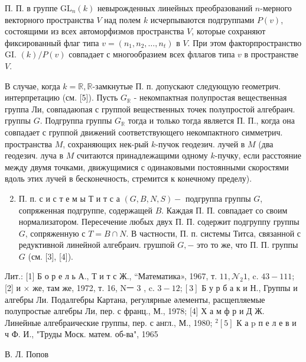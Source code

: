 \documentclass[10pt]{article}
\begin{document}
П. П. в группе $\mathrm{GL}_{n}(k)$ невырожденных линейных преобразований $n$-мерного векторного пространства $V$ над полем $k$ исчерпываются подгруппами $P(v)$, состоящими из всех автоморфизмов пространства $V$, которые сохраняют фиксированный флаг типа $v=\left(n_{1}, n_{2}, \ldots, n_{t}\right)$ в $V$. При этом факторпространство GI. $(k) / P(v)$ совпадает с многообразием всех фллагов типа $v$ в пространстве $V$.



В случае, когда $k=\mathbb{R}, \mathbb{R}$-замкнутые П. п. допускают следующую геометрич. интерпретацию (см. [5]). Пусть $G_{\mathbb{R}}$ - некомпактная полупростая вещественная группа Ли, совпадаюпая с группой вещественных точек полупростой алгебраич. группы $G$. Подгруппа группы $G_{\mathbb{R}}$ тогда и только тогда является П. П., когда она совпадает с группой движений соответствующего некомпактного симметрич. пространства $M$, сохраняющих нек-рый $k$-пучок геодезич. лучей в $M$ (два геодезич. луча в $M$ считаются принадлежащими одному $k$-пучку, если расстояние между двумя точками, движущимися с одинаковыми постоянными скоростями вдоль этих лучей в бесконечность, стремится к конечному пределу).



\begin{enumerate}

  \setcounter{enumi}{1}

  \item П. п. с и с т е м ы Т и т с а $(G, B, N, S)-$ подгруппа группы $G$, сопряженная подгруппе, содержащей $B$. Каждая П. П. совпадает со своим нормализатором. Пересечение любых двух П. П. содержит подгруппу группы $G$, сопряженную с $T=B \cap N$. В частности, П. п. системы Титса, связанной с редуктивной линейной алгебраич. грушпой $G,-$ это то же, что П. П. группы $G$ (см. [3], [4]).

\end{enumerate}



Лит.: [1] Б о р е л ь А., Т и т с Ж., “Математика», 1967, т. $11, \mathcal{N}_{2} 1$, c. $43-111$; [2] и $\times$ же, там же, 1972, т. 16, Nㅡ 3 , c. $3-12 ;[3]$ Б у р б а к и Н., Группы и алгебры Ли. Подалгебры Картана, регулярные әлементы, расщепляемые полупростые алгебры Ли, пер. с франц., М., 1978; [4] Х а м ф р и Д Ж. Линейные алгебраические группы, пер. с англ., М., 1980; ${ }^{2}[5]$ К а p п е л е в и ч Ф. И., "Труды Моск. матем. об-ва", 1965

В. Л. Попов
\end{document}
